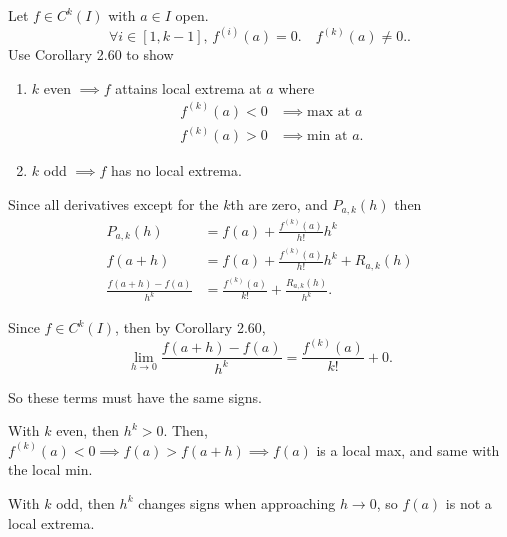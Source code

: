 \documentclass[../hw1]{subfiles}
\begin{document}
\begin{problem}[8]
Let $f\in C^k(I)$ with $a \in I$ open.
\[
	\forall i \in [1,k-1],\, f^{(i)}(a)=0.\quad f^{(k)}(a)\neq 0.
	.\]
Use Corollary 2.60 to show
\begin{enumerate}[label=\roman*)]
	\item $k$ even  $\implies f$ attains local extrema at $a$ where
	      \begin{align*}
		      f^{(k)}(a)<0 & \implies \text{max at } a \\
		      f^{(k)}(a)>0 & \implies \text{min at } a
		      .\end{align*}
	\item $k$ odd  $\implies f$ has no local extrema.
\end{enumerate}
\end{problem}
Since all derivatives except for the $k$th are zero, and $P_{a,k}(h)$ then
\begin{align*}
	P_{a,k}(h)                & =f(a) + \frac{f^{(k)}(a)}{h!}h^k                 \\
	f(a+h)                    & =f(a) + \frac{f^{(k)}(a)}{h!}h^k  + R_{a,k}(h)   \\
	\frac{f(a + h)-f(a)}{h^k} & = \frac{f^{(k)}(a)}{k!} + \frac{R_{a,k}(h)}{h^k}
	.\end{align*}

Since $f \in C^k(I)$, then by Corollary 2.60, \[
	\lim_{h \to 0} \frac{f(a + h) - f(a)}{h^k} = \frac{f^{(k)}(a)}{k!} + 0
	.\]

So these terms must have the same signs.

With $k$ even, then  $h^k>0$.
Then, $f^{(k)}(a)<0 \implies f(a)>f(a+h) \implies f(a)$ is a local max, and same with the local min.

With $k$ odd, then $h^k$ changes signs when approaching $h\to 0$, so $f(a)$ is not a local extrema.
\end{document}
